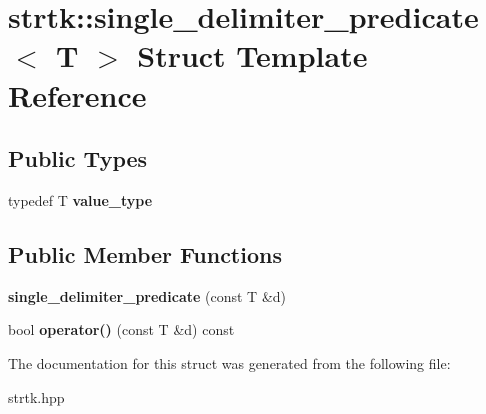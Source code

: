 \hypertarget{structstrtk_1_1single__delimiter__predicate}{\section{strtk\-:\-:single\-\_\-delimiter\-\_\-predicate$<$ T $>$ Struct Template Reference}
\label{structstrtk_1_1single__delimiter__predicate}
}
\subsection*{Public Types}
\begin{DoxyCompactItemize}
\item 
\hypertarget{structstrtk_1_1single__delimiter__predicate_a5603bccfdf958a51c26a707817110b20}{typedef T {\bfseries value\-\_\-type}}\label{structstrtk_1_1single__delimiter__predicate_a5603bccfdf958a51c26a707817110b20}

\end{DoxyCompactItemize}
\subsection*{Public Member Functions}
\begin{DoxyCompactItemize}
\item 
\hypertarget{structstrtk_1_1single__delimiter__predicate_a0ed1c9bb3be6e1b1f17b925581172ed7}{{\bfseries single\-\_\-delimiter\-\_\-predicate} (const T \&d)}\label{structstrtk_1_1single__delimiter__predicate_a0ed1c9bb3be6e1b1f17b925581172ed7}

\item 
\hypertarget{structstrtk_1_1single__delimiter__predicate_a9fad2ef48a50310de9533a5642684732}{bool {\bfseries operator()} (const T \&d) const }\label{structstrtk_1_1single__delimiter__predicate_a9fad2ef48a50310de9533a5642684732}

\end{DoxyCompactItemize}


The documentation for this struct was generated from the following file\-:\begin{DoxyCompactItemize}
\item 
strtk.\-hpp\end{DoxyCompactItemize}
